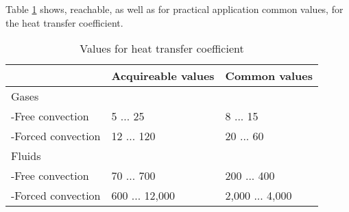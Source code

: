 Table \ref{fig:htc_values} shows, reachable, as well as for practical application common values, for the heat transfer coefficient.
\begin{table}[ht]
\centering
\caption{Values for heat transfer coefficient}
\label{fig:htc_values}
\begin{tabular}{lll}
&Acquireable values&Common values\\
\hline
Gases&&\\
-Free convection&5 ... 25&8 ... 15\\
-Forced convection&12 ... 120&20 ... 60\\
Fluids&&\\
-Free convection&70 ... 700&200 ... 400\\
-Forced convection&600 ... 12,000&2,000 ... 4,000\\
\end{tabular}
\end{table}







